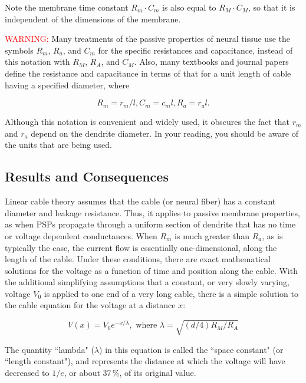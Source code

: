\documentclass[12pt]{article}
\begin{document}
Note the membrane time constant $R_m\cdot C_m$ is also equal to $R_M\cdot C_M$, so that it is independent of the dimensions of the membrane.

\textcolor{red}{WARNING:} Many treatments of the passive properties of neural tissue use the symbols $R_m$, $R_a$, and $C_m$ for the specific resistances and capacitance, instead of this notation with $R_M$, $R_A$, and $C_M$. Also, many textbooks and journal papers define the resistance and capacitance in terms of that for a unit length of cable having a specified diameter, where

\begin{displaymath}
	R_m = r_m/l, C_m = c_ml, R_a = r_al.
\end{displaymath}

Although this notation is convenient and widely used, it obscures the fact that $r_m$ and $r_a$ depend on the dendrite diameter. In your reading, you should be aware of the units that are being used.

\subsection*{Results and Consequences}

Linear cable theory assumes that the cable (or neural fiber) has a constant diameter and leakage resistance. Thus, it applies to passive membrane properties, as when PSPs propagate through a uniform section of dendrite that has no time or voltage dependent conductances. When $R_m$ is much greater than $R_a$, as is typically the case, the current flow is essentially one-dimensional, along the length of the cable. Under these conditions, there are exact mathematical solutions for the voltage as a function of time and position along the cable. With the additional simplifying assumptions that a constant, or very slowly varying, voltage $V_0$ is applied to one end of a very long cable, there is a simple solution to the cable equation for the voltage at a distance $x$:


\begin{displaymath}
	V(x) = V_0 e^{-x/\lambda}, \mbox{ where } \lambda = \sqrt{(d/4)R_M/R_A}
\end{displaymath}

The quantity ``lambda" ($\lambda$) in this equation is called the ``space constant" (or ``length constant"), and represents the distance at which the voltage will have decreased to $1/e$, or about 37\,\%, of its original value.
\end{document}
